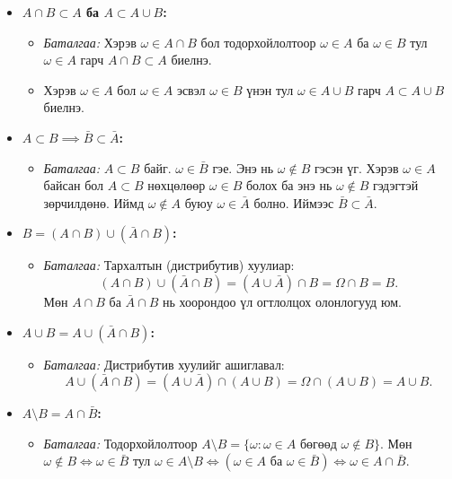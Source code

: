 \documentclass[11pt,a4paper]{article}
\begin{document}
\begin{itemize}[leftmargin=1.4em, itemsep=3pt]
  \item[\textbf{а)}] \textbf{$A \cap B \subset A$ ба $A \subset A \cup B$:}
  \begin{itemize}
    \item \textit{Баталгаа:} Хэрэв $\omega \in A \cap B$ бол тодорхойлолтоор $\omega \in A$ ба $\omega \in B$ тул $\omega \in A$ гарч $A \cap B \subset A$ биелнэ.
    \item Хэрэв $\omega \in A$ бол $\omega \in A$ эсвэл $\omega \in B$ үнэн тул $\omega \in A \cup B$ гарч $A \subset A \cup B$ биелнэ.
  \end{itemize}
  \item[\textbf{б)}] \textbf{$A \subset B \implies \bar{B} \subset \bar{A}$:}
  \begin{itemize}
    \item \textit{Баталгаа:} $A \subset B$ байг. $\omega \in \bar{B}$ гэе. Энэ нь $\omega \notin B$ гэсэн үг. Хэрэв $\omega \in A$ байсан бол $A \subset B$ нөхцөлөөр $\omega \in B$ болох ба энэ нь $\omega \notin B$ гэдэгтэй зөрчилдөнө. Иймд $\omega \notin A$ буюу $\omega \in \bar{A}$ болно. Иймээс $\bar{B} \subset \bar{A}$.
  \end{itemize}
  \item[\textbf{в)}] \textbf{$B = (A \cap B) \cup (\bar{A} \cap B)$:}
  \begin{itemize}
    \item \textit{Баталгаа:} Тархалтын (дистрибутив) хуулиар:
    \[
      (A \cap B) \cup (\bar{A} \cap B) = (A \cup \bar{A}) \cap B = \Omega \cap B = B.
    \]
    Мөн $A \cap B$ ба $\bar{A} \cap B$ нь хоорондоо үл огтлолцох олонлогууд юм.
  \end{itemize}
  \item[\textbf{г)}] \textbf{$A \cup B = A \cup (\bar{A} \cap B)$:}
  \begin{itemize}
    \item \textit{Баталгаа:} Дистрибутив хуулийг ашиглавал:
    \[
      A \cup (\bar{A} \cap B) = (A \cup \bar{A}) \cap (A \cup B) = \Omega \cap (A \cup B) = A \cup B.
    \]
  \end{itemize}
  \item[\textbf{д)}] \textbf{$A \setminus B = A \cap \bar{B}$:}
  \begin{itemize}
    \item \textit{Баталгаа:} Тодорхойлолтоор $A \setminus B = \{\omega : \omega \in A \text{ бөгөөд } \omega \notin B\}$. Мөн $\omega \notin B \iff \omega \in \bar{B}$ тул $\omega \in A \setminus B \iff (\omega \in A \text{ ба } \omega \in \bar{B}) \iff \omega \in A \cap \bar{B}$.
  \end{itemize}
\end{itemize}
\end{document}
